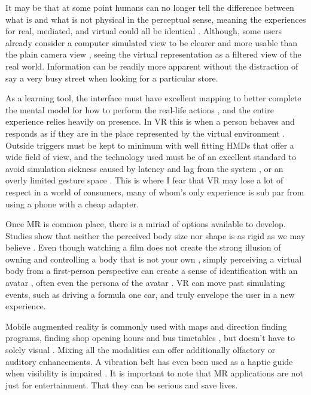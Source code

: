 \documentclass{scrartcl}
\begin{document}
It may be that at some point humans can no longer tell the difference between what is and what is not physical in the perceptual sense, meaning the experiences for real, mediated, and virtual could all be identical \cite{rosa2016re}. Although, some users already consider a computer simulated view to be clearer and more usable than the plain camera view \cite{venta2014investigating}, seeing the virtual representation as a filtered view of the real world. Information can be readily more apparent without the distraction of say a very busy street when looking for a particular store.

As a learning tool, the interface must have excellent mapping to better complete the mental model for how to perform the real-life actions \cite{skalski2011mapping}, and the entire experience relies heavily on presence. In VR this is when a person behaves and responds as if they are in the place represented by the virtual environment \cite{bianchi2013understanding}. Outside triggers must be kept to minimum with well fitting HMDs that offer a wide field of view, and the technology used must be of an excellent standard to avoid simulation sickness caused by latency and lag from the system \cite{biocca1997cyborg} \cite{steinicke2014self}, or an overly limited gesture space \cite{walter2000incremental}. This is where I fear that VR may lose a lot of respect in a world of consumers, many of whom's only experience is sub par from using a phone with a cheap adapter.

Once MR is common place, there is a miriad of options available to develop. Studies show that neither the perceived body size nor shape is as rigid as we may believe \cite{kilteni2012extending}. Even though watching a film does not create the strong illusion of owning and controlling a body that is not your own \cite{madary2016real}, simply perceiving a virtual body from a first-person perspective can create a sense of identification with an avatar \cite{won2015homuncular}, often even the persona of the avatar \cite{yoon2014know}. VR can move past simulating events, such as driving a formula one car, and truly envelope the user in a new experience.

Mobile augmented reality \cite{de2012mobile} is commonly used with maps and direction finding programs, finding shop opening hours and bus timetables \cite{venta2012user}, but doesn't have to solely visual \cite{kalawsky2000taxonomy}. Mixing all the modalities \cite{lindeman2007classification} can offer additionally olfactory or auditory enhancements. A vibration belt has even been used as a haptic guide when visibility is impaired \cite{van2005waypoint}. It is important to note that MR applications are not just for entertainment. That they can be serious and save lives.
\end{document}
